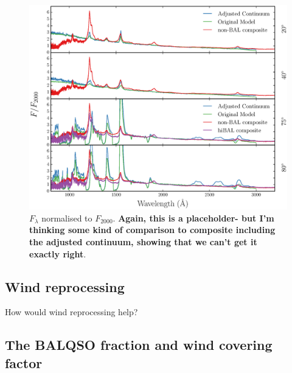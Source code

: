 \documentclass[preprint, a4paper, 11pt]{aastex}
\begin{document}
\begin{figure} %
\centering
\includegraphics[width=1.0\textwidth]{figures/adjusted_withbals.eps}
\caption
{
$F_\lambda$ normalised to $F_{2000}$. {\bf Again, this is a placeholder- but I'm thinking some kind of comparison to composite including the adjusted continuum, showing that we can't get it exactly right}.
}
\label{fig:finalcomp}
\end{figure} %

\subsection{Wind reprocessing}

How would wind reprocessing help?





\subsection{The BALQSO fraction and wind covering factor}
\end{document}
